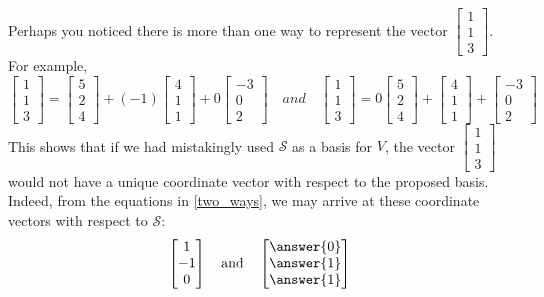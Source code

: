 \documentclass{ximera}
\begin{document}
\begin{example}
\begin{explanation}\label{rref} 
Perhaps you noticed there is more than one way to represent the vector $\begin{bmatrix}1\\1\\3\end{bmatrix}$.  For example, 
\begin{equation}\begin{bmatrix}1\\1\\3\end{bmatrix}=\begin{bmatrix}5\\2\\4\end{bmatrix}+ (-1)\begin{bmatrix}4\\1\\1\end{bmatrix}+0\begin{bmatrix}-3\\0\\2\end{bmatrix} \quad
and 
\quad \begin{bmatrix}1\\1\\3\end{bmatrix}=0\begin{bmatrix}5\\2\\4\end{bmatrix}+ \begin{bmatrix}4\\1\\1\end{bmatrix}+\begin{bmatrix}-3\\0\\2\end{bmatrix}\end{equation}\label{two_ways}
This shows that if we had mistakingly used $\mathcal{S}$ as a basis for $V$, the vector $\begin{bmatrix}1\\1\\3\end{bmatrix}$ would not have a unique coordinate vector with respect to the proposed basis.  Indeed, from the equations in \ref{two_ways}, we may arrive at these coordinate vectors with respect to $\mathcal{S}$:
$$\begin{bmatrix}1\\-1\\0\end{bmatrix}\quad\text{and}\quad\begin{bmatrix}\answer{0}\\\answer{1}\\\answer{1}\end{bmatrix}$$


\end{explanation}
\end{example}
\end{document}
